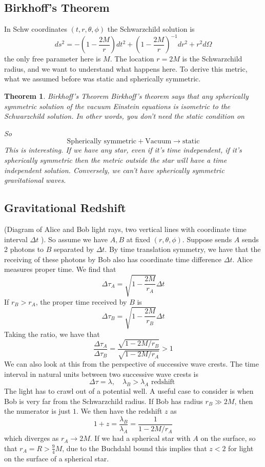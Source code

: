 \documentclass[11pt, oneside]{article}   	%
\theoremstyle{slanted}
\newtheorem*{thm}{Theorem}
\begin{document}
\subsection{Birkhoff's Theorem}
In Schw coordinates $ \left( t , r, \theta, \phi  \right)  $
the Schwarzchild solution is 
\[
ds ^ 2  =  - \left( 1 - \frac{2M}{r }  \right) dt ^ 2 + 
\left( 1 - \frac{2M}{r }  \right)  ^{ - 1 } dr ^ 2 + r ^ 2 d \Omega
\] the only free parameter here is $ M $.
The location $ r  = 2M $ is the Schwarzchild radius, 
and we want to understand what happens here.
To derive this metric, 
what we assumed before was static and spherically symmetric.

\begin{thm}{Birkhoff's Theorem}
Birkhoff's theorem says that 
any spherically symmetric solution 
of the vacuum Einstein equations 
is isometric to the Schwarzchild solution. 
In other words, you don't need the static condition on

So
\[
\text{Spherically symmetric}  + \text{Vacuum} \to \text{static}
\] This is interesting. 
If we have any star, even if it's time independent, 
if it's spherically symmetric then the metric 
outside the star will have a time independent solution. 
Conversely, we can't have 
spherically symmetric gravitational waves. 


\end{thm}
\subsection{Gravitational Redshift}
(Diagram of Alice and Bob light rays, two vertical lines 
with coordinate time interval $ \Delta t $ ). 
So assume we have $ A, B $ at fixed $ \left( r, \theta, \phi  \right)  $. 
Suppose sends $ A $ sends 2 photons to $ B $ separated 
by $ \Delta t $. By time translation symmetry, 
we have that the receiving of these photons 
by Bob also has coordinate time difference
$ \Delta t $. 
Alice measures proper time. 
We find that 
\[
\Delta \tau _ A  = \sqrt{ 1 - \frac{2M}{r_A } }  \Delta t 
\] If $ r _ B > r _ A  $, the proper time 
received by $ B $ is 
\[
\Delta \tau _ B  = \sqrt{ 1 - \frac{2M}{r _ B } }  \Delta t 
\] Taking the ratio, 
we have that 
\[
\frac{ \Delta \tau  _ A }{ \Delta \tau _ B  } = 
\frac{ \sqrt{ 1 - 2M / r _ B } }{\sqrt{  1 - 2M / r _ A } } > 1 
\]  We can also look at this 
from the perspective of 
successive wave crests. 
The time interval in natural units between 
two successive wave crests is 
\[
\Delta \tau = \lambda, \quad \lambda _ B > \lambda _ A \text{ redshift }
\] The light has to crawl out 
of a potential well. 
A useful case to consider is 
when Bob is very far from the Schwarzchild radius. 
If Bob has radius $ r _ B \gg 2M $, then the 
numerator is just $ 1 $. 
We then have the redshift $ z $ as 
\[
1 + z  = \frac{ \lambda _ B }{ \lambda _ A }  = \frac{1}{ 1 - 2M / r _ A }
\] which diverges as $ r _ A \to 2M $. 
If we had a spherical star with $ A $ on the surface, 
so that  $ r _ A  = R  > \frac{9}{4 } M $, due to the 
Buchdahl bound this implies 
that $ z < 2 $ for light on the surface of a spherical 
star. 
\end{document}
